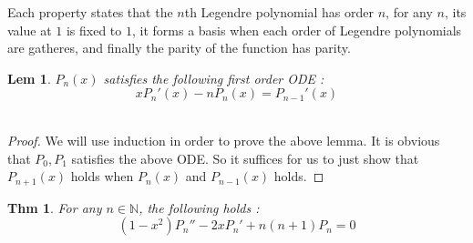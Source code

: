 \documentclass[paper=a4, fontsize=11pt]{scrartcl}
\newtheorem{theorem}{Thm}
\newtheorem{lemma}{Lem}
\begin{document}
Each property states that the $n$th Legendre polynomial has order $n$, for any $n$, its value at $1$ is fixed to $1$, it forms a basis when each order of Legendre polynomials are gatheres, and finally the parity of the function has parity. \\

\begin{lemma}
$P_n(x)$ satisfies the following first order ODE : \\

\begin{equation}\nonumber
	x P_n'(x) -n P_n(x) = P_{n-1}'(x)
\end{equation}\\
\end{lemma}

\begin{proof}
	We will use induction in order to prove the above lemma. It is obvious that $P_0,P_1$ satisfies the above ODE. So it suffices for us to just show that $P_{n+1}(x)$ holds when $P_n(x)$ and $P_{n-1}(x)$ holds.
\end{proof}

\begin{theorem}
For any $n\in \mathbb{N}$, the following holds : \\

\begin{equation}\nonumber
	(1-x^2)P_n'' - 2x P_n' + n(n+1) P_n =0
\end{equation}\\
\end{theorem}
\end{document}
